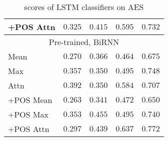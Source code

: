 \begin{table}
\begin{tabular}{lrrrr}
    +POS Attn & $0.325$ & $0.415$ & $0.595$ & $0.732$ \\
    \midrule \multicolumn{5}{c}{Pre-trained, BiRNN} \\ \midrule
    Mean & $0.270$ & $0.366$ & $0.464$ & $0.675$ \\
    Max & $0.357$ & $0.350$ & $0.495$ & $0.748$ \\
    Attn & $\mathbf{0.392}$ & $0.350$ & $0.584$ & $0.707$ \\
    +POS Mean & $0.263$ & $0.341$ & $0.472$ & $0.650$ \\
    +POS Max & $0.353$ & $0.455$ & $0.495$ & $0.740$ \\
    +POS Attn & $0.297$ & $0.439$ & $0.637$ & $\mathbf{0.772}$ \\
    \bottomrule
  \end{tabular}
  \caption{\FI scores of LSTM classifiers on AES}
  \label{tab:lstm-results}
\end{table}

